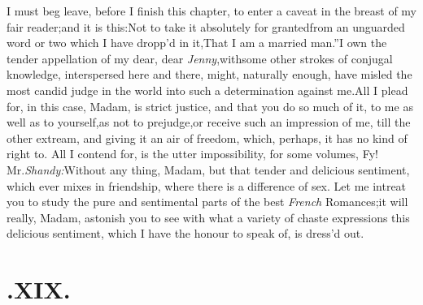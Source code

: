 \documentclass{article}
\begin{document}
I must beg leave, before I finish this chapter, to enter a
caveat in the breast of my fair reader;\tsk  and it is
this:\tsh\break  Not to take it absolutely for granted\break from an
unguarded word or two which I have dropp’d in
it,\tsh\lqq That I am a married
man.”\tsk  I own the tender appel\-lation of my dear, dear
\textit{Jenny},\tsk  with\break some other strokes of conjugal know\-ledge,
interspersed here and there, might, naturally enough, have misled
the most candid judge in the world into such a determination
against me.\tsk  All I plead for, in this case, Madam, is strict
justice, and that you do so much of it, to me as well as to
yourself,\tsk  as not to prejudge,\break or receive such an impression
of me, till
the other
extream, and giving it an air of freedom, which, perhaps, it has no
kind of right to. All I contend for, is the utter impossibility,
for some volumes, 
Fy! Mr.\@ \textit{Shandy:}\tsk  Without
any thing, Madam, but that tender and delicious\break
sentiment, which ever mixes in friend\-ship, where there is a difference of
sex.\break
Let me intreat you to study the pure and sentimental parts of the best
\textit{French}\break 
Romances;\tsh  it will really, Madam,\break
astonish you to see with what a variety of chaste expressions
this delicious sentiment, which I have the honour to speak of,
is dress’d out.

\null
\section{.\enspace XIX.}
\end{document}
